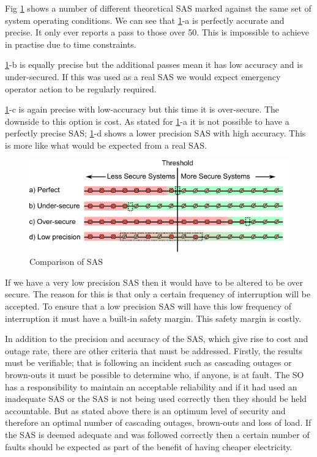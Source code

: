 \documentclass[a4paper,oneside,12pt]{report}
\begin{document}
Fig \ref{SAScomparison} shows a number of different theoretical SAS marked against the same set of system operating conditions. We can see that \ref{SAScomparison}-a is perfectly accurate and precise. It only ever reports a pass to those over 50. This is impossible to achieve in practise due to time constraints.

\ref{SAScomparison}-b is equally precise but the additional passes mean it has low accuracy and is under-secured.  If this was used as a real SAS we would expect emergency operator action to be regularly required.

\ref{SAScomparison}-c is again precise with low-accuracy but this time it is over-secure. The downside to this option is cost. As stated for \ref{SAScomparison}-a it is not possible to have a perfectly precise SAS; \ref{SAScomparison}-d shows a lower precision SAS with high accuracy. This is more like what would be expected from a real SAS.


  \begin{figure}
    \begin{center}
      \includegraphics[scale=0.7]{sascomparison.png}
      \caption{Comparison of SAS}
      \label{SAScomparison}
    \end{center}
  \end{figure}



If we have a very low precision SAS then it would have to be altered to be over secure. The reason for this is that only a certain frequency of interruption will be accepted. To ensure that a low precision SAS will have this low frequency of interruption it must have a built-in safety margin. This safety margin is costly.

In addition to the precision and accuracy of the SAS, which give rise to cost and outage rate, there are other criteria that must be addressed. Firstly, the results must be verifiable; that is following an incident such as cascading outages or brown-outs it must be possible to determine who, if anyone, is at fault. The SO has a responsibility to maintain an acceptable reliability and if it had used an inadequate SAS or the SAS is not being used correctly then they should be held accountable. But as stated above there is an optimum level of security and therefore an optimal number of cascading outages, brown-outs and loss of load. If the SAS is deemed adequate and was followed correctly then a certain number of faults should be expected as part of the benefit of having cheaper electricity.
\end{document}
